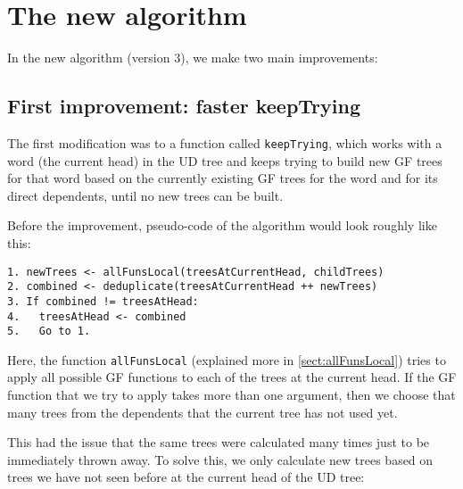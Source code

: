 \chapter{The new algorithm}


In the new algorithm (version 3), we make two main improvements:


\section{First improvement: faster keepTrying}

The first modification was to a function called \texttt{keepTrying}, which works with a word (the current head) in the UD tree and keeps trying to build new GF trees for that word based on the currently existing GF trees for the word and for its direct dependents, until no new trees can be built.

Before the improvement, pseudo-code of the algorithm would look roughly like this:
\begin{verbatim}
1. newTrees <- allFunsLocal(treesAtCurrentHead, childTrees)
2. combined <- deduplicate(treesAtCurrentHead ++ newTrees)
3. If combined != treesAtHead:
4.   treesAtHead <- combined
5.   Go to 1.
\end{verbatim}

Here, the function \texttt{allFunsLocal} (explained more in \autoref{sect:allFunsLocal}) tries to apply all possible GF functions to each of the trees at the current head. If the GF function that we try to apply takes more than one argument, then we choose that many trees from the dependents that the current tree has not used yet.

%

This had the issue that the same trees were calculated many times just to be immediately thrown away. To solve this, we only calculate new trees based on trees we have not seen before at the current head of the UD tree:

